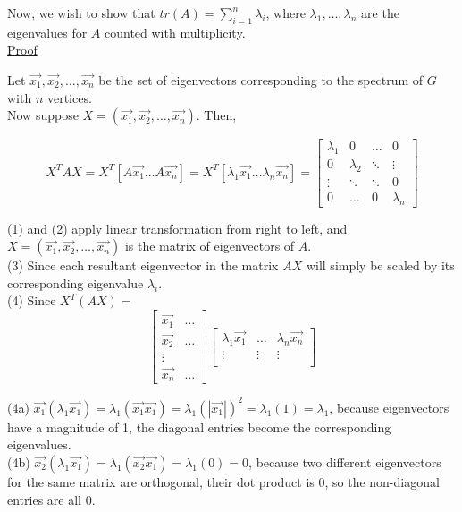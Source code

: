 \documentclass{article}
\begin{document}
Now, we wish to show that $tr(A) = \sum^{n}_{i=1} \lambda_i$, where $\lambda_1, \ldots, \lambda_n$ are the eigenvalues for $A$ counted with multiplicity. \\

\underline{Proof}

Let $\vec{x_1}, \vec{x_2}, \ldots, \vec{x_n}$ be the set of eigenvectors corresponding to the spectrum of $G$ with $n$ vertices. \\

Now suppose $X = (\vec{x_1}, \vec{x_2}, \ldots, \vec{x_n})$. Then,

\[
X^TAX = X^T[A\vec{x_1} \ldots A\vec{x_n}] = X^T[\lambda_1\vec{x_1} \ldots \lambda_n\vec{x_n}]
= 
\begin{bmatrix}
\lambda_1 & 0 &\ldots & 0\\
0 & \lambda_2 & \ddots  & \vdots\\
\vdots  &\ddots  & \ddots & 0\\ 
0 &\ldots & 0 & \lambda_n
\end{bmatrix}
\]

(1) and (2) apply linear transformation from right to left, and $X = (\vec{x_1}, \vec{x_2}, \ldots, \vec{x_n})$ is the matrix of eigenvectors of $A$. \\
(3) Since each resultant eigenvector in the matrix $AX$ will simply be scaled by its corresponding eigenvalue $\lambda_i$. \\
(4) Since $X^T(AX) = $
\[
\begin{bmatrix}
\vec{x_1} & \ldots \\
\vec{x_2} & \ldots\\
\vdots  & \\ 
\vec{x_n} & \ldots
\end{bmatrix}
\begin{bmatrix}
\lambda_1\vec{x_1} & \ldots & \lambda_n\vec{x_n} \\
\vdots & \vdots & \vdots \\
\end{bmatrix}
\]

(4a) $\vec{x_1}(\lambda_1\vec{x_1}) = \lambda_1(\vec{x_1}\vec{x_1}) = \lambda_1(|\vec{x_1}|)^2 = \lambda_1(1) = \lambda_1$, because eigenvectors have a magnitude of 1, the diagonal entries become the corresponding eigenvalues. \\

(4b) $\vec{x_2}(\lambda_1\vec{x_1}) = \lambda_1(\vec{x_2}\vec{x_1}) = \lambda_1(0) = 0$, because two different eigenvectors for the same matrix are orthogonal, their dot product is 0, so the non-diagonal entries are all 0. \\
\end{document}
